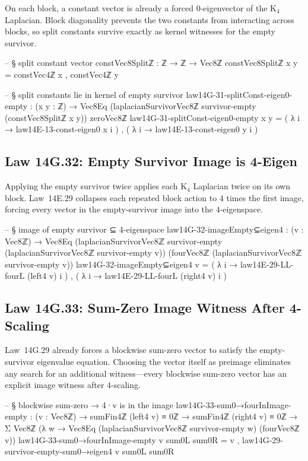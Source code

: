 \documentclass[11pt,a4paper]{book}
\def\Rightarrow{=>}%
\def\texorpdfstring#1#2{#2}%
\begin{document}
On each block, a constant vector is already a forced $0$-eigenvector of the K$_4$ Laplacian. Block diagonality prevents the two constants from interacting across blocks, so split constants survive exactly as kernel witnesses for the empty survivor.

\begin{code}
-- § split constant vector
constVec8Splitℤ : ℤ → ℤ → Vec8ℤ
constVec8Splitℤ x y = constVec4ℤ x , constVec4ℤ y

-- § split constants lie in kernel of empty survivor
law14G-31-splitConst-eigen0-empty : (x y : ℤ) → Vec8Eq (laplacianSurvivorVec8ℤ survivor-empty (constVec8Splitℤ x y)) zeroVec8ℤ
law14G-31-splitConst-eigen0-empty x y =
  ( λ i → law14E-13-const-eigen0 x i ) ,
  ( λ i → law14E-13-const-eigen0 y i )
\end{code}

\subsection{Law 14G.32: Empty Survivor Image is 4-Eigen}

Applying the empty survivor twice applies each K$_4$ Laplacian twice on its own block. Law~14E.29 collapses each repeated block action to $4$ times the first image, forcing every vector in the empty-survivor image into the $4$-eigenspace.

\begin{code}
-- § image of empty survivor ⊆ 4-eigenspace
law14G-32-imageEmpty⊆eigen4 : (v : Vec8ℤ) →
  Vec8Eq (laplacianSurvivorVec8ℤ survivor-empty (laplacianSurvivorVec8ℤ survivor-empty v))
        (fourVec8ℤ (laplacianSurvivorVec8ℤ survivor-empty v))
law14G-32-imageEmpty⊆eigen4 v =
  ( λ i → law14E-29-LL-fourL (left4 v) i ) ,
  ( λ i → law14E-29-LL-fourL (right4 v) i )
\end{code}

\subsection{Law 14G.33: Sum-Zero \texorpdfstring{$\Rightarrow$}{} Image Witness After 4-Scaling}

Law~14G.29 already forces a blockwise sum-zero vector to satisfy the empty-survivor eigenvalue equation. Choosing the vector itself as preimage eliminates any search for an additional witness---every blockwise sum-zero vector has an explicit image witness after $4$-scaling.

\begin{code}
-- § blockwise sum-zero → 4·v is in the image
law14G-33-sum0→fourInImage-empty : (v : Vec8ℤ) → sumFin4ℤ (left4 v) ≡ 0ℤ → sumFin4ℤ (right4 v) ≡ 0ℤ →
  Σ Vec8ℤ (λ w → Vec8Eq (laplacianSurvivorVec8ℤ survivor-empty w) (fourVec8ℤ v))
law14G-33-sum0→fourInImage-empty v sum0L sum0R = v , law14G-29-survivor-empty-sum0→eigen4 v sum0L sum0R
\end{code}
\end{document}
